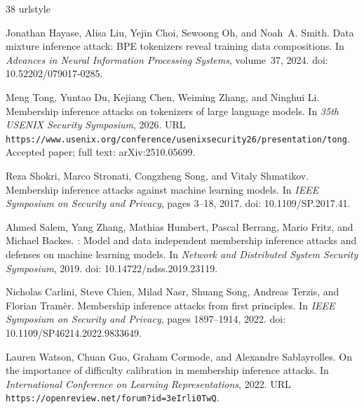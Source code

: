 \begin{thebibliography}{38}
\providecommand{\url}[1]{\texttt{#1}}
\expandafter\ifx\csname urlstyle\endcsname\relax
  \providecommand{\doi}[1]{doi: #1}\else
  \providecommand{\doi}{doi: \begingroup \urlstyle{rm}\Url}\fi

Jonathan Hayase, Alisa Liu, Yejin Choi, Sewoong Oh, and Noah~A. Smith.
\newblock Data mixture inference attack: {BPE} tokenizers reveal training data
  compositions.
\newblock In \emph{Advances in Neural Information Processing Systems},
  volume~37, 2024.
\newblock \doi{10.52202/079017-0285}.

Meng Tong, Yuntao Du, Kejiang Chen, Weiming Zhang, and Ninghui Li.
\newblock Membership inference attacks on tokenizers of large language models.
\newblock In \emph{35th USENIX Security Symposium}, 2026.
\newblock URL
  \url{https://www.usenix.org/conference/usenixsecurity26/presentation/tong}.
\newblock Accepted paper; full text: arXiv:2510.05699.

Reza Shokri, Marco Stronati, Congzheng Song, and Vitaly Shmatikov.
\newblock Membership inference attacks against machine learning models.
\newblock In \emph{IEEE Symposium on Security and Privacy}, pages 3--18, 2017.
\newblock \doi{10.1109/SP.2017.41}.

Ahmed Salem, Yang Zhang, Mathias Humbert, Pascal Berrang, Mario Fritz, and
  Michael Backes.
: Model and data independent membership inference attacks
  and defenses on machine learning models.
\newblock In \emph{Network and Distributed System Security Symposium}, 2019.
\newblock \doi{10.14722/ndss.2019.23119}.

Nicholas Carlini, Steve Chien, Milad Nasr, Shuang Song, Andreas Terzis, and
  Florian Tram{\`e}r.
\newblock Membership inference attacks from first principles.
\newblock In \emph{IEEE Symposium on Security and Privacy}, pages 1897--1914,
  2022.
\newblock \doi{10.1109/SP46214.2022.9833649}.

Lauren Watson, Chuan Guo, Graham Cormode, and Alexandre Sablayrolles.
\newblock On the importance of difficulty calibration in membership inference
  attacks.
\newblock In \emph{International Conference on Learning Representations}, 2022.
\newblock URL \url{https://openreview.net/forum?id=3eIrli0TwQ}.


\end{thebibliography}
